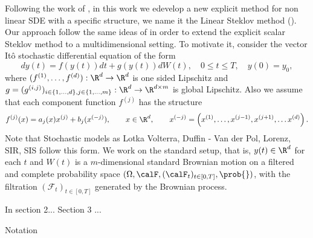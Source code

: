 	Following the work of \citeauthor*{Higham2002b}, in this work we edevelop a new explicit method for non linear SDE 
with a specific structure, we name it the Linear Steklov method (\SM). Our approach follow the same ideas of 
\cite{Diaz-Infante2015} in order to extend the explicit scalar Steklov method to a multidimensional setting. To
 motivate it, consider the  vector It\^o stochastic differential equation of the form
\begin{equation}\label{eqn:SDE1}
	dy(t)
	 =f(y(t))dt + g(y(t))dW(t), \quad 0\leq t\leq T,
	\quad y(0)=y_0,
\end{equation}
where $(f^{(1)},\dots, f^{(d)}):\R^d \to \R^d$ is one sided Lipschitz and 
$g = (g^{(i,j)})_{i\in \{1,\dots,d\}, j\in\{1,\dots, m\}}:\R^d \to \R^{d\times m}$ is global Lipschitz. Also we assume 
that  each component function $f^{(j)}$  has the structure
$$
	f^{(j)}(x) = a_j(x) x^{(j)} + b_j (x^{(-j)}), \qquad x\in \R^d, \qquad 
	x^{(-j)} = \left( x^{(1)},\dots,x^{(j-1)},x^{(j+1)},\dots x^{(d)}\right).
$$ 
Note that Stochastic models as Lotka Volterra, Duffin - Van der Pol, Lorenz, SIR, SIS follow this form. 
We work on the standard setup, that is,  $y(t)\in \R^d$ for each $t$ and  $W(t)$ is a
$m$-dimensional standard Brownian motion on a filtered and complete probability space
$
	(
		\Omega ,\calF,(\calF_t)_{t\in[0,T]},\prob{}
	)
$,
with the filtration
$(\mathcal{F}_t)_{t\in[0,T]}$  generated by the Brownian process.


In section 2... Section 3 ...

Notation